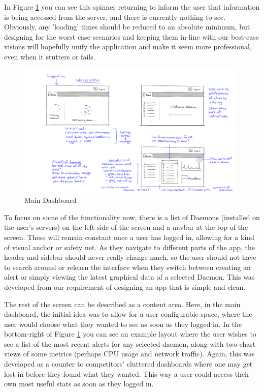 \documentclass{l3proj}
\begin{document}
In Figure \ref{fig:MainDash} you can see this spinner returning to inform the user that information is being accessed from the server, and there is currently nothing to see.  Obviously, any 'loading' times should be reduced to an absolute minimum, but designing for the worst case scenarios and keeping them in-line with our best-case visions will hopefully unify the application and make it seem more professional, even when it stutters or fails.

\begin{figure}[H]
\centering
\includegraphics[width=110mm]{Concept_Designs/MainView.png}
\caption{Main Dashboard}
\label{fig:MainDash}
\end{figure}

To focus on some of the functionality now, there is a list of Daemons (installed on the user's servers) on the left side of the screen and a navbar at the top of the screen. These will remain constant once a user has logged in, allowing for a kind of visual anchor or safety net. As they navigate to different parts of the app, the header and sidebar should never really change much, so the user should not have to search around or relearn the interface when they switch between creating an alert or simply viewing the latest graphical data of a selected Daemon. This was developed from our requirement of designing an app that is simple and clean.

The rest of the screen can be described as a content area.  Here, in the main dashboard, the initial idea was to allow for a user configurable space, where the user would choose what they wanted to see as soon as they logged in. In the bottom-right of Figure \ref{fig:MainDash} you can see an example layout where the user wishes to see a list of the most recent alerts for any selected daemon, along with two chart views of some metrics (perhaps CPU usage and network traffic). Again, this was developed as a counter to competitors' cluttered dashboards where one may get lost in before they found what they wanted. This way a user could access their own most useful stats as soon as they logged in.
\end{document}
